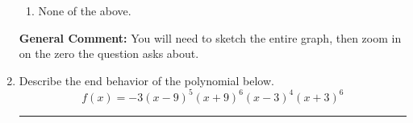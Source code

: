 \documentclass{extbook}[14pt]
\newcommand{\litem}[1]{\item #1

\rule{\textwidth}{0.4pt}}
\begin{document}
\begin{enumerate}
{\begin{enumerate}[label=\Alph*.]
\item None of the above.\end{enumerate}
\textbf{General Comment:} You will need to sketch the entire graph, then zoom in on the zero the question asks about.
}
\litem{
Describe the end behavior of the polynomial below.
\[ f(x) = -3(x - 9)^{5}(x + 9)^{6}(x - 3)^{4}(x + 3)^{6} \]

}
\end{enumerate}
\end{document}
